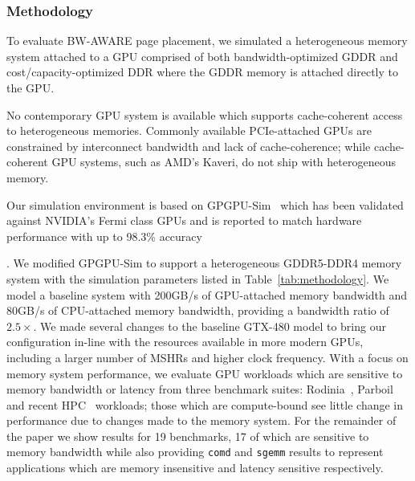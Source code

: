 \subsubsection{Methodology\\}
To evaluate BW-AWARE page placement, we simulated a heterogeneous 
memory system attached to a GPU comprised of both bandwidth-optimized GDDR and cost/capacity-optimized
DDR where the GDDR memory is attached directly to the GPU\@.
{\color{black} No contemporary GPU
system is available which supports cache-coherent access to heterogeneous memories.
Commonly available PCIe-attached GPUs are constrained by interconnect bandwidth 
and lack of cache-coherence; while cache-coherent GPU systems, such as AMD's Kaveri, do not ship 
with heterogeneous memory. 

Our simulation environment is based on GPGPU-Sim~\cite{gpgpusimIspass09}
which has been validated against NVIDIA's Fermi class GPUs and is reported to match
hardware performance with up to 98.3\% accuracy~\cite{gpgpusimManual}}.
We modified GPGPU-Sim to support a heterogeneous GDDR5-DDR4
memory system with the simulation parameters listed in
Table~\ref{tab:methodology}.  We model a baseline system with 200GB/s
of GPU-attached memory bandwidth and 80GB/s of CPU-attached memory bandwidth, providing a
bandwidth ratio of $2.5\times$\@. {\color{black} We made several changes to the baseline GTX-480 model 
to bring our configuration in-line with the resources available in 
more modern GPUs, including a larger number of MSHRs and higher clock frequency.}
With a focus on memory system performance, we evaluate GPU workloads which are sensitive to memory 
bandwidth or latency from three benchmark suites: Rodinia~\cite{Che2009},
Parboil~\cite{Parboil} and recent HPC~\cite{comd,cns,minife,xsbench} workloads; those which are compute-bound 
see little change in performance due to changes made to the memory system.
{\color{black}For the
remainder of the paper we show results for 19 benchmarks, 17 of which are sensitive
to memory bandwidth while also providing {\tt comd} and {\tt sgemm} results to represent applications
which are memory insensitive and latency sensitive respectively.}

